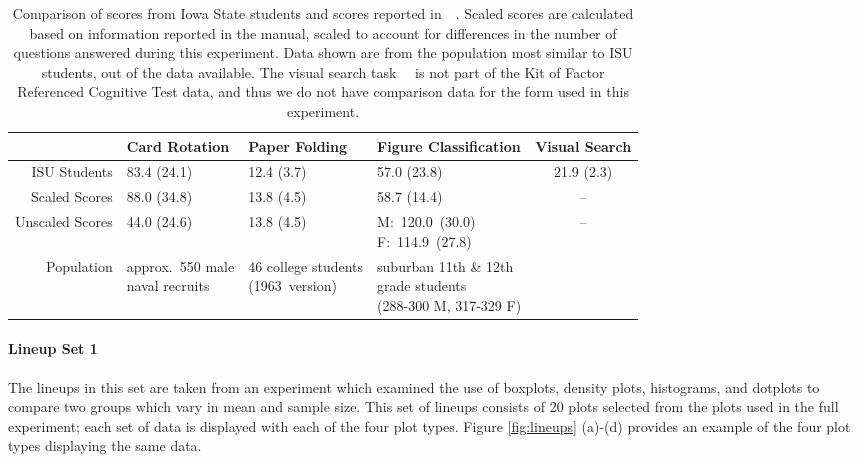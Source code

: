 \documentclass[journal]{vgtc}\usepackage[]{graphicx}\usepackage[]{color}
\begin{document}
\begin{table*}[htbp]\centering
\begin{tabular}{rlllc}
\hline
  & Card Rotation & Paper Folding & Figure Classification & Visual Search  \\\hline
ISU Students & 83.4 (24.1) 
             & 12.4 (3.7)
             & 57.0 (23.8)\footnotemark[1]
             & 21.9 (2.3)\\
Scaled Scores & 88.0 (34.8)
              & 13.8 (4.5)
              & 58.7 (14.4)\footnotemark[2]
              & -- \\
Unscaled Scores & 44.0 (24.6)\footnotemark[3]
                & 13.8 (4.5)
                & \parbox[c]{.2\linewidth}{M:~120.0~(30.0)\\ F:~114.9~(27.8)}
                & --\\\hline
{\footnotesize Population}    
              & \parbox[t]{.15\linewidth}{\footnotesize approx.\ 550 male\\ naval recruits} 
              & \parbox[t]{.17\linewidth}{\footnotesize 46 college students\\(1963~version)}
              & \parbox[t]{.2\linewidth}{\footnotesize suburban 11th \& 12th \\ grade students\\(288-300 M, 317-329 F)}
              & \\\hline
\end{tabular}
\caption[Comparison of scores for cognitive tasks.]{Comparison of scores from Iowa State students and scores reported in~\protect~\cite{ekstrom1976manual}. Scaled scores are calculated based on information reported in the manual, scaled to account for differences in the number of questions answered during this experiment. Data shown are from the population most similar to ISU students, out of the data available. The visual search task~\protect~\cite{goldstein1973validity,demita1981validity,moerland1986neuropsychological} is not part of the Kit of Factor Referenced Cognitive Test data, and thus we do not have comparison data for the form used in this experiment.
\label{tab:scorecomparison}}
\end{table*}

\paragraph{Lineup Set 1}
The lineups in this set are taken from an experiment which examined the use of boxplots, density plots, histograms, and dotplots to compare two groups which vary in mean and sample size. This set of lineups consists of 20 plots selected from the plots used in the full experiment; each set of data is displayed with each of the four plot types. Figure \ref{fig:lineups} (a)-(d) provides an example of the four plot types displaying the same data.\hphantom{\ref{tab:scorecomparison}}
\end{document}
